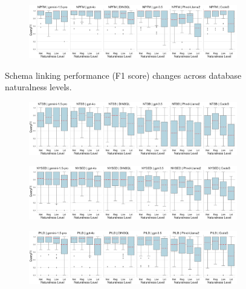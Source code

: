 \begin{figure}
\begin{subfigure}{\textwidth}
      \centering
      \includegraphics[width=\textwidth]{figures/natlevel-boxplots/natlevel-model-f1-boxplot-NPFM.pdf}
    \end{subfigure}
    \caption{Schema linking performance (F1 score) changes across database naturalness levels.}
    \label{fig:db-level-boxplots-f1-1}
  \end{figure}
  
  \begin{figure}
    \centering
    \begin{subfigure}{\textwidth}
      \centering
      \includegraphics[width=\textwidth]{figures/natlevel-boxplots/natlevel-model-f1-boxplot-NTSB.pdf}
    \end{subfigure}
    \begin{subfigure}{\textwidth}
      \centering
      \includegraphics[width=\textwidth]{figures/natlevel-boxplots/natlevel-model-f1-boxplot-NYSED.pdf}
    \end{subfigure}
    \begin{subfigure}{\textwidth}
      \centering
      \includegraphics[width=\textwidth]{figures/natlevel-boxplots/natlevel-model-f1-boxplot-PILB.pdf}

\end{subfigure}
\end{figure}
